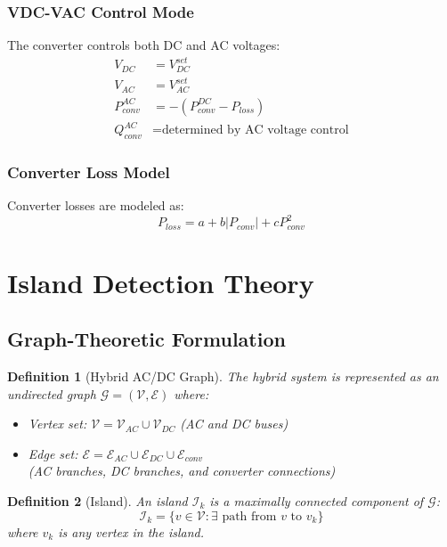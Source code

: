 \documentclass[11pt]{article}
\newtheorem{definition}{Definition}
\begin{document}
\subsubsection{VDC-VAC Control Mode}
The converter controls both DC and AC voltages:
\begin{align}
V_{DC} &= V_{DC}^{set} \\
V_{AC} &= V_{AC}^{set} \\
P_{conv}^{AC} &= -(P_{conv}^{DC} - P_{loss}) \\
Q_{conv}^{AC} &= \text{determined by AC voltage control}
\end{align}

\subsubsection{Converter Loss Model}
Converter losses are modeled as:
\begin{equation}
P_{loss} = a + b|P_{conv}| + cP_{conv}^2
\label{eq:conv_loss}
\end{equation}

\section{Island Detection Theory}

\subsection{Graph-Theoretic Formulation}

\begin{definition}[Hybrid AC/DC Graph]
The hybrid system is represented as an undirected graph $\mathcal{G} = (\mathcal{V}, \mathcal{E})$ where:
\begin{itemize}
    \item Vertex set: $\mathcal{V} = \mathcal{V}_{AC} \cup \mathcal{V}_{DC}$ (AC and DC buses)
    \item Edge set: $\mathcal{E} = \mathcal{E}_{AC} \cup \mathcal{E}_{DC} \cup \mathcal{E}_{conv}$ \\
    (AC branches, DC branches, and converter connections)
\end{itemize}
\end{definition}

\begin{definition}[Island]
An island $\mathcal{I}_k$ is a maximally connected component of $\mathcal{G}$:
\begin{equation}
\mathcal{I}_k = \{v \in \mathcal{V} : \exists \text{ path from } v \text{ to } v_k\}
\end{equation}
where $v_k$ is any vertex in the island.
\end{definition}
\end{document}

